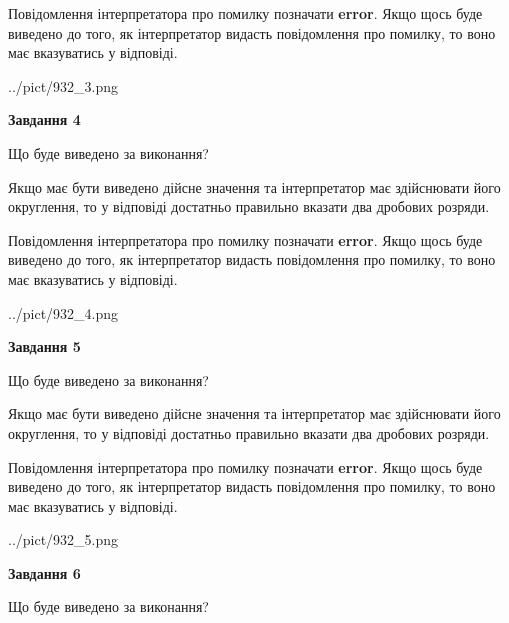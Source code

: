 \documentclass[12pt, ukrainian]{article}
\begin{document}
{\begin {Large}
Повідомлення інтерпретатора про помилку позначати \textbf{error}.
Якщо щось буде виведено до того, як інтерпретатор видасть повідомлення про помилку, 
то воно має вказуватись у відповіді. \par

\begin{center}
	{../pict/932_3.png}
\end{center}
\newpage

{\begin {center}\textbf{Завдання 4}\end {center}}\par
Що буде виведено за виконання? \par

Якщо має бути виведено дійсне значення та інтерпретатор має здійснювати його округлення, 
то у відповіді достатньо правильно вказати два дробових розряди.

Повідомлення інтерпретатора про помилку позначати \textbf{error}.
Якщо щось буде виведено до того, як інтерпретатор видасть повідомлення про помилку, 
то воно має вказуватись у відповіді. \par

\begin{center}
	{../pict/932_4.png}
\end{center}
\newpage

{\begin {center}\textbf{Завдання 5}\end {center}}\par
Що буде виведено за виконання? \par

Якщо має бути виведено дійсне значення та інтерпретатор має здійснювати його округлення, 
то у відповіді достатньо правильно вказати два дробових розряди.

Повідомлення інтерпретатора про помилку позначати \textbf{error}.
Якщо щось буде виведено до того, як інтерпретатор видасть повідомлення про помилку, 
то воно має вказуватись у відповіді. \par

\begin{center}
	{../pict/932_5.png}
\end{center}
\newpage

{\begin {center}\textbf{Завдання 6}\end {center}}\par
Що буде виведено за виконання? \par


\end{Large}}
\end{document}
